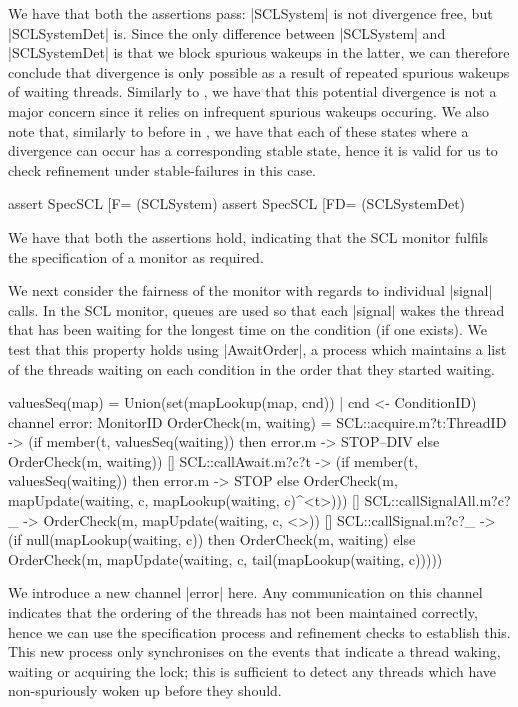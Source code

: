 We have that both the assertions pass: |SCLSystem| is not divergence free, but |SCLSystemDet| is. Since the only difference between |SCLSystem| and |SCLSystemDet| is that we block spurious wakeups in the latter, we can therefore conclude that divergence is only possible as a result of repeated spurious wakeups of waiting threads. Similarly to , we have that this potential divergence is not a major concern since it relies on infrequent spurious wakeups occuring. We also note that, similarly to before in , we have that each of these states where a divergence can occur has a corresponding stable state, hence it is valid for us to check refinement under stable-failures in this case.

\begin{cspm}
  assert SpecSCL [F= (SCLSystem) 
  assert SpecSCL [FD= (SCLSystemDet)
\end{cspm}

We have that both the assertions hold, indicating that the SCL monitor fulfils the specification of a monitor as required.

We next consider the fairness of the monitor with regards to individual |signal| calls. In the SCL monitor, queues are used so that each |signal| wakes the thread that has been waiting for the longest time on the condition (if one exists). We test that this property holds using |AwaitOrder|, a process which maintains a list of the threads waiting on each condition in the order that they started waiting.

\begin{cspm}
valuesSeq(map) = Union({set(mapLookup(map, cnd)) | cnd <- ConditionID})
channel error: MonitorID
OrderCheck(m, waiting) = 
      SCL::acquire.m?t:ThreadID -> 
      (if member(t, valuesSeq(waiting)) then error.m -> STOP--DIV
        else OrderCheck(m, waiting))
  [] SCL::callAwait.m?c?t -> 
      (if member(t, valuesSeq(waiting)) then error.m -> STOP
        else OrderCheck(m, mapUpdate(waiting, c, mapLookup(waiting, c)^<t>)))
  [] SCL::callSignalAll.m?c?_ -> 
        OrderCheck(m, mapUpdate(waiting, c, <>))
  [] SCL::callSignal.m?c?_ -> 
      (if null(mapLookup(waiting, c)) then OrderCheck(m, waiting)
        else OrderCheck(m, mapUpdate(waiting, c, 
                                    tail(mapLookup(waiting, c)))))
\end{cspm}

We introduce a new channel |error| here. Any communication on this channel indicates that the ordering of the threads has not been maintained correctly, hence we can use the specification process and refinement checks to establish this. This new process only synchronises on the events that indicate a thread waking, waiting or acquiring the lock; this is sufficient to detect any threads which have non-spuriously woken up before they should.

